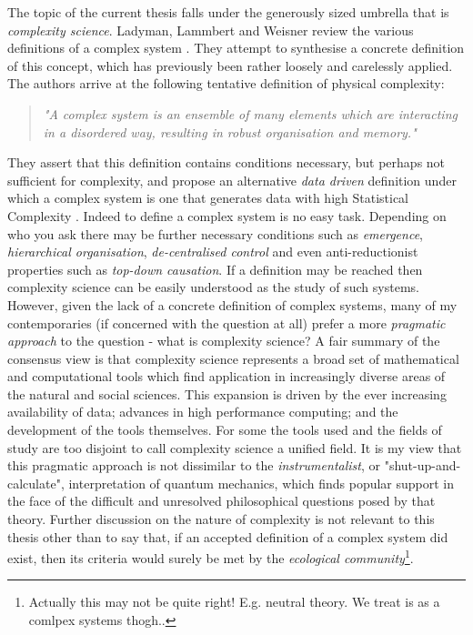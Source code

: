The topic of the current thesis falls under the generously sized umbrella that is \emph{complexity science}. Ladyman, Lammbert and Weisner review the various definitions of a complex system \cite{ladyman2013complex}. They attempt to synthesise a concrete definition of this concept, which has previously been rather loosely and carelessly applied. The authors arrive at the following tentative  definition of physical complexity:
\begin{quotation}
\emph{"A  complex  system  is  an  ensemble  of  many  elements which are interacting in a disordered way, resulting in robust organisation and memory."}
\end{quotation}
They assert that this definition contains conditions necessary, but perhaps not sufficient for complexity, and propose an alternative \emph{data driven} definition under which a complex system is one that generates data with high Statistical Complexity \cite{crutchfield1989inferring}. Indeed to define a complex system is no easy task. Depending on who you ask there may be further necessary conditions such as \emph{emergence}, \emph{hierarchical organisation}, \emph{de-centralised control} and even anti-reductionist properties such as \emph{top-down causation}. If a definition may be reached then complexity science can be easily understood as the study of such systems. However, given the lack of a concrete definition of complex systems, many of my contemporaries (if concerned with the question at all) prefer a more \emph{pragmatic approach} to the question - what is complexity science? A fair summary of the consensus view is that complexity science represents a broad set of mathematical and computational tools which find application in increasingly diverse areas of the natural and social sciences. This expansion is driven by the ever increasing availability of data; advances in high performance computing; and the development of the tools themselves. For some the tools used and the fields of study are too disjoint to call complexity science a unified field. It is my view that this pragmatic approach is not dissimilar to the \emph{instrumentalist}, or "shut-up-and-calculate", interpretation of quantum mechanics\cite{norris2002quantum}, which finds popular support in the face of the difficult and unresolved philosophical questions posed by that theory. Further discussion on the nature of complexity is not relevant to this thesis other than to say that, if an accepted definition of a complex system did exist, then its criteria would surely be met by the \emph{ecological community}\footnote{Actually this may not be quite right! E.g. neutral theory. We treat is as a comlpex systems thogh..}.


